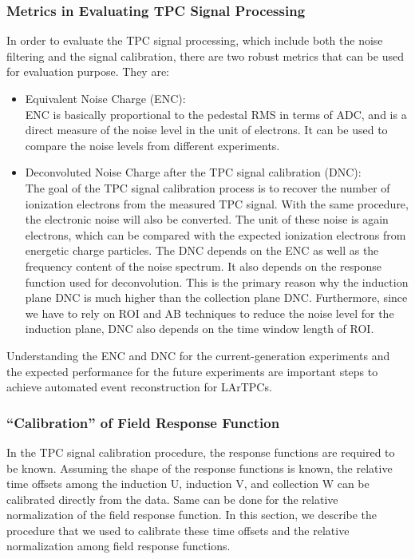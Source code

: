 \subsubsection{Metrics in Evaluating TPC Signal Processing}

In order to evaluate the TPC signal processing, which include both the noise filtering and 
the signal calibration, there are two robust metrics that can be used for evaluation 
purpose. 
They are:
\begin{itemize}
\item Equivalent Noise Charge (ENC): \\
  ENC is  basically proportional to the pedestal RMS in terms of ADC, and is a direct 
measure of the noise level in the unit of electrons. It can be used to compare the 
noise levels from different experiments.
\item Deconvoluted Noise Charge after the TPC signal calibration (DNC): \\
The goal of the TPC signal calibration process is to recover the number of ionization 
electrons from the measured TPC signal. With the same procedure, the electronic noise
will also be converted. The unit of these noise is again electrons, which can be compared with 
the expected ionization electrons from energetic charge particles. 
The DNC depends on the ENC as well as the frequency content of the noise spectrum. It
also depends on the response function used for deconvolution. This is the primary reason 
why the induction plane DNC is much higher than the collection plane DNC. Furthermore, since
we have to rely on ROI and AB techniques to reduce the noise level for the induction plane,
DNC also depends on the time window length of ROI. 
\end{itemize}
Understanding the ENC and DNC for the current-generation experiments and the expected 
performance for the future experiments are important steps to achieve automated event 
reconstruction for LArTPCs.


\subsubsection{``Calibration'' of Field Response Function}

In the TPC signal calibration procedure, the response functions are required to be known. 
Assuming the shape of the response functions is known, the relative time 
offsets among the induction U, induction V, and collection W can be calibrated directly 
from the data. Same can be done for the relative normalization 
of the field response function. In this section, we describe the procedure 
that we used to calibrate these time offsets and the relative normalization among field response
functions. 

